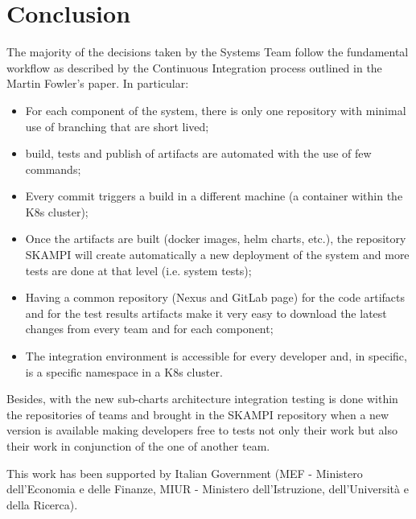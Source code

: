 \documentclass[a4paper]{spie}  %
\begin{document}
\section{Conclusion}
The majority of the decisions taken by the Systems Team follow the fundamental workflow as described by the Continuous Integration process outlined in the Martin Fowler’s paper. In particular:
\begin{itemize}
    \item For each component of the system, there is only one repository with minimal use of branching that are short lived;
    \item build, tests and publish of artifacts are automated with the use of few commands;
    \item Every commit triggers a build in a different machine (a container within the K8s cluster);
    \item Once the artifacts are built (docker images, helm charts, etc.), the repository SKAMPI will create automatically a new deployment of the system and more tests are done at that level (i.e. system tests);
    \item Having a common repository (Nexus and GitLab page) for the code artifacts and for the test results artifacts make it very easy to download the latest changes from every team and for each component;
    \item The integration environment is accessible for every developer and, in specific, is a specific namespace in a K8s cluster.
\end{itemize}

Besides, with the new sub-charts architecture integration testing is done within the repositories of teams and brought in the SKAMPI repository when a new version is available making developers free to tests not only their work but also their work in conjunction of the one of another team.

\acknowledgments %

This work has been supported by Italian Government (MEF - Ministero dell'Economia e delle Finanze, MIUR - Ministero dell'Istruzione, dell'Università e della Ricerca).

\end{document}
